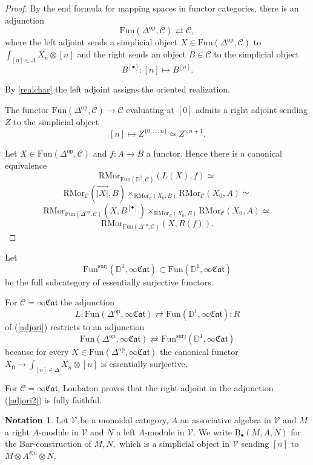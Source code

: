 \documentclass[10pt,oneside]{article}
\numberwithin{equation}{section} %
\numberwithin{figure}{section} %
\theoremstyle{plain}
\theoremstyle{definition}
\newtheorem{notation}[thm]{Notation}
\newcommand{\bD}{{\mathbb D}}
\newcommand{\mC}{{\mathcal C}}
\newcommand{\mV}{{\mathcal V}}
\newcommand{\B}{\mathrm{B}}
\newcommand{\op}{\mathrm{op}}
\newcommand{\surj}{\mathrm{surj}}
\newcommand{\ot}{\otimes}
\newcommand{\Fun}{\mathrm{Fun}}
\newcommand{\RMor}{\mathrm{RMor}}
\newcommand{\fcat}{\mathfrak{Cat}}
\begin{document}
\begin{proof}

By the end formula for mapping spaces in functor categories, there is an adjunction
$$ \Fun(\Delta^\op, \mC) \rightleftarrows \mC, $$
where the left adjoint sends a simplicial object 
$X \in \Fun(\Delta^\op, \mC)$ to $ \int_{[n] \in \Delta} X_n \ot [n] $
and the right sends an object $ B \in \mC $ to the simplicial object
$$B^{[\bullet]}: [n] \mapsto B^{[n]}.$$

By \cref{realchar} the left adjoint assigns the oriented realization.

The functor $\Fun(\Delta^\op, \mC)  \to \mC$ evaluating at $[0]$
admits a right adjoint sending $Z $ to the simplicial object $$[n] \mapsto Z^{\{0,...,n \}} \simeq Z^{\times n+1}.$$

Let $X \in \Fun(\Delta^\op, \mC)$ and $f: A \to B$ a functor.
Hence there is a canonical equivalence
$$ \RMor_{\Fun(\bD^1, \mC)}(L(X), f) \simeq $$$$ \RMor_{\mC}(\overset{\to}{| X|}, B) \times_{\RMor_{\mC}(X_0, B)} \RMor_{\mC}(X_0, A) \simeq $$
$$\RMor_{\Fun(\Delta^\op,\mC)}(X, B^{[\bullet]}) \times_{\RMor_{\mC}(X_0, B)} \RMor_{\mC}(X_0, A) \simeq $$$$ \RMor_{\Fun(\Delta^\op,\mC)}(X, R(f)). $$
\end{proof}

\begin{remark}\label{equivori}

Let $$ \Fun^\surj(\bD^1,  \infty\fcat)\subset \Fun(\bD^1,  \infty\fcat)$$
be the full subcategory of essentially surjective functors.

For $\mC= \infty\fcat$ the adjunction 
$$
L: \Fun(\Delta^\op,  \infty\fcat) \rightleftarrows \Fun(\bD^1,  \infty\fcat): R $$ of
(\ref{adjori})
restricts to an adjunction 
\begin{equation}\label{adjori2}
\Fun(\Delta^\op,  \infty\fcat) \rightleftarrows \Fun^\surj(\bD^1,  \infty\fcat) \end{equation}
because for every $X \in \Fun(\Delta^\op,  \infty\fcat)$ the canonical functor $X_0 \to \int_{[n] \in \Delta} X_n \ot [n]$
is essentially surjective.

For $\mC= \infty\fcat$, Loubaton \cite{loubaton2025effectivity} proves that the right adjoint in the adjunction (\ref{adjori2}) is fully faithful.
    
\end{remark}

\begin{notation}

Let $\mV$ be a monoidal category, $A $ an associative algebra in $\mV$ and $M$ a right $A$-module in $\mV$ and $N$ a left $A$-module in $\mV.$ 
We write $\B_\bullet(M,A,N)$ for the Bar-construction of $M, N,$
which is a simplicial object in $\mV$ sending
$[n]$ to $M \ot A^{\ot n} \ot N.$

\end{notation}
\end{document}
